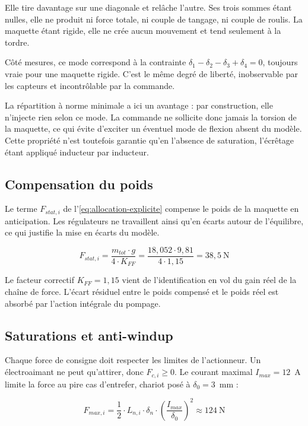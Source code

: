 Elle tire davantage sur une diagonale et relâche l'autre. Ses trois sommes étant nulles, elle ne produit ni force totale, ni couple de tangage, ni couple de roulis. La maquette étant rigide, elle ne crée aucun mouvement et tend seulement à la tordre.

Côté mesures, ce mode correspond à la contrainte $\delta_1 - \delta_2 - \delta_3 + \delta_4 = 0$, toujours vraie pour une maquette rigide. C'est le même degré de liberté, inobservable par les capteurs et incontrôlable par la commande.

La répartition à norme minimale a ici un avantage : par construction, elle n'injecte rien selon ce mode. La commande ne sollicite donc jamais la torsion de la maquette, ce qui évite d'exciter un éventuel mode de flexion absent du modèle. Cette propriété n'est toutefois garantie qu'en l'absence de saturation, l'écrêtage étant appliqué inducteur par inducteur.

\subsection{Compensation du poids}

Le terme $F_{stat,i}$ de l'\autoref{eq:allocation-explicite} compense le poids de la maquette en anticipation. Les régulateurs ne travaillent ainsi qu'en écarts autour de l'équilibre, ce qui justifie la mise en écarts du modèle.

\begin{equation}
    F_{stat,i} = \frac{m_{tot} \cdot g}{4 \cdot K_{FF}} = \frac{18{,}052 \cdot 9{,}81}{4 \cdot 1{,}15} = 38{,}5\ \mathrm{N}
    \label{eq:feedforward}
\end{equation}

Le facteur correctif $K_{FF} = 1{,}15$ vient de l'identification en vol du gain réel de la chaîne de force. L'écart résiduel entre le poids compensé et le poids réel est absorbé par l'action intégrale du pompage.

\subsection{Saturations et anti-windup}
\label{sec:anti-windup}

Chaque force de consigne doit respecter les limites de l'actionneur. Un électroaimant ne peut qu'attirer, donc $F_{c,i} \geq 0$. Le courant maximal $I_{max} = 12$~A limite la force au pire cas d'entrefer, chariot posé à $\delta_0 = 3$~mm :

\begin{equation}
    F_{max,i} = \frac{1}{2} \cdot L_{n,i} \cdot \delta_n \cdot \left(\frac{I_{max}}{\delta_0}\right)^{2} \approx 124\ \mathrm{N}
    \label{eq:fmax}
\end{equation}

